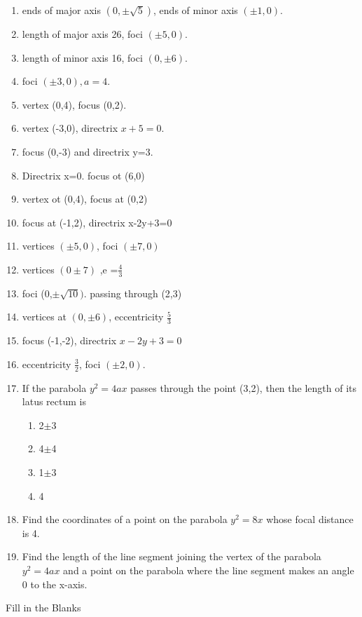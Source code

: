 \begin{enumerate}[label=\thesubsection.\arabic*,ref=\thesubsection.\theenumi,resume*]
\item ends of major axis $(0,\pm \sqrt{5})$, ends of minor axis $(\pm1,0)$.
\item length of major axis 26, foci $(\pm5,0)$.
\item length of minor axis 16, foci $(0,\pm6)$.
\item foci $(\pm3,0),a=4$.
\item vertex (0,4),  focus (0,2). 
\item vertex (-3,0),  directrix $x+5=0$.
\item focus (0,-3) and directrix y=3.
\item  Directrix x=0. focus ot (6,0)
\item  vertex  ot (0,4), focus at (0,2)
\item  focus at (-1,2), directrix x-2y+3=0
	 \item  vertices $(\pm5,0)$, foci $(\pm 7,0)$
	 \item vertices $(0\pm7)$ ,e =$\frac{4}{3}$ 
	 \item  foci (0,$\pm\sqrt{10})$. passing through (2,3)
\item vertices at $(0,\pm6)$,  eccentricity $\frac{5}{3}$
\item focus (-1,-2),  directrix $x-2y+3=0$ 
\item eccentricity $\frac{3}{2}$, foci $(\pm2,0)$.
\item If the parabola $y^2=4ax$ passes through the point (3,2), then the length of its latus rectum is
\begin{enumerate}
\item 2$\pm$3
\item 4$\pm$4
\item 1$\pm$3
\item 4
\end{enumerate}
 \item Find the coordinates of a point on the parabola $y^2=8x$ whose focal distance is 4.
 \item Find the length of the line segment joining the vertex of the parabola $y^2=4ax$ and a point on the parabola where the line segment makes an angle 0 to the x-axis.
\end{enumerate}
Fill in the Blanks
